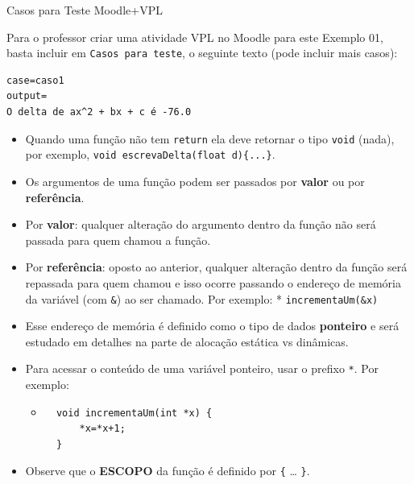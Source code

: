 \documentclass[12pt,a4paper]{article}
\begin{document}
    Casos para Teste Moodle+VPL

Para o professor criar uma atividade VPL no Moodle para este Exemplo 01,
basta incluir em \texttt{Casos\ para\ teste}, o seguinte texto (pode
incluir mais casos):

\begin{verbatim}
case=caso1
output= 
O delta de ax^2 + bx + c é -76.0
\end{verbatim}

    \begin{itemize}
\item
  Quando uma função não tem \texttt{return} ela deve retornar o tipo
  \texttt{void} (nada), por exemplo,
  \texttt{void\ escrevaDelta(float\ d)\{...\}}.
\item
  Os argumentos de uma função podem ser passados por \textbf{valor} ou
  por \textbf{referência}.
\item
  Por \textbf{valor}: qualquer alteração do argumento dentro da função
  não será passada para quem chamou a função.
\item
  Por \textbf{referência}: oposto ao anterior, qualquer alteração dentro
  da função será repassada para quem chamou e isso ocorre passando o
  endereço de memória da variável (com \texttt{\&}) ao ser chamado. Por
  exemplo: * \texttt{incrementaUm(\&x)}
\item
  Esse endereço de memória é definido como o tipo de dados
  \textbf{ponteiro} e será estudado em detalhes na parte de alocação
  estática vs dinâmicas.
\item
  Para acessar o conteúdo de uma variável ponteiro, usar o prefixo
  \texttt{*}. Por exemplo:

  \begin{itemize}
  \item
\begin{verbatim}
  void incrementaUm(int *x) {
      *x=*x+1;
  }
\end{verbatim}
  \end{itemize}
\item
  Observe que o \textbf{ESCOPO} da função é definido por \texttt{\{}
  \ldots{} \texttt{\}}.
\end{itemize}
\end{document}
